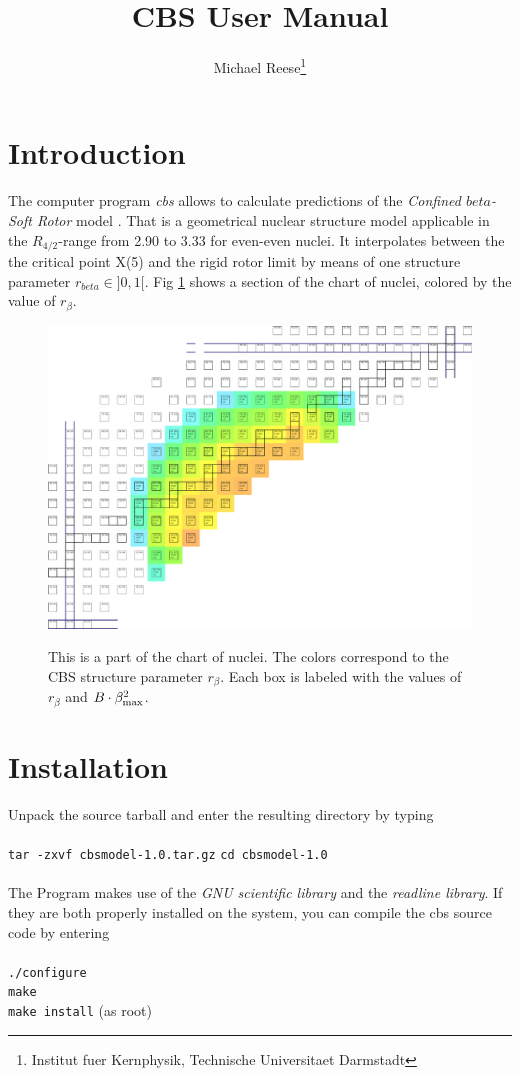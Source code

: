 \documentclass[10pt,a4paper]{article}
\title{CBS User Manual}
\author{Michael Reese\footnote{Institut fuer Kernphysik, Technische Universitaet Darmstadt}}
\begin{document}
\maketitle

\tableofcontents
\newpage

\section{Introduction}
The computer program \textit{cbs} allows to calculate predictions of the \textit{Confined $beta$-Soft Rotor} model \cite{Pietralla}. That is a geometrical nuclear structure model applicable in the $R_{4/2}$-range from 2.90 to 3.33 for even-even nuclei. It interpolates between the the critical point X(5) \cite{Iachello} and the rigid rotor limit by means of one structure parameter $r_{beta} \in ]0,1[$. Fig \ref{CBSchart} shows a section of the chart of nuclei, colored by the value of $r_{\beta}$.
\begin{figure}
\includegraphics[width=\textwidth]{r_beta_chart.pdf} \label{CBSchart}
\caption{This is a part of the chart of nuclei. The colors correspond to the CBS structure parameter $r_{\beta}$. Each box is labeled with the values of $r_{\beta}$ and $B\cdot\beta_{\rm max}^2$.}
\end{figure}

\section{Installation}
Unpack the source tarball and enter the resulting directory by typing
\\~\\
\verb!tar -zxvf cbsmodel-1.0.tar.gz!
\verb!cd cbsmodel-1.0!
\\~\\
The Program makes use of the \textit{GNU scientific library} and the \textit{readline library}. If they are both properly installed on the system, you can compile the cbs source code by entering 
\\~\\
\verb!./configure! \\
\verb!make! \\
\verb!make install!  (as root)\\
\end{document}
